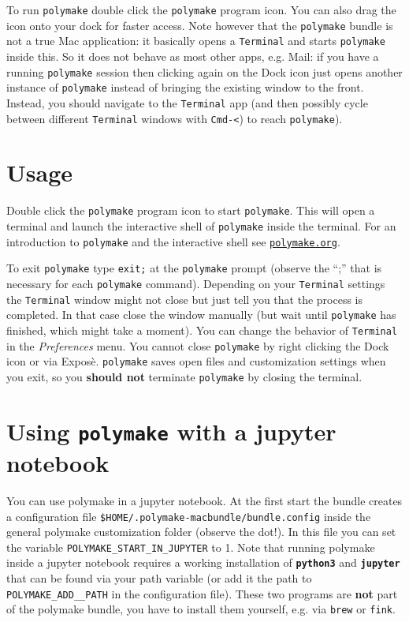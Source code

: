 \documentclass[a4paper]{amsart}
\newcommand{\polymake}{\texttt{polymake}\xspace}
\begin{document}
To run \polymake double click the \polymake program icon. You can also drag the icon onto your dock for faster access. Note however that the \polymake bundle is not a true Mac application: it basically opens a \texttt{Terminal} and starts \polymake inside this. So it does not behave as most other apps, e.g. Mail: if you have a running \polymake session then clicking again on the Dock icon just opens another instance of \polymake instead of bringing the existing window to the front. Instead, you should navigate to the \texttt{Terminal} app (and then possibly cycle between different \texttt{Terminal} windows with \texttt{Cmd-<}) to reach \polymake).

\section*{Usage}

Double click the \polymake program icon to start \polymake. This will open a terminal and launch the interactive shell of \polymake inside the terminal. For an introduction to \polymake and the interactive shell see \href{http://polymake.org}{\tt polymake.org}\;.

To exit \polymake type \texttt{exit;} at the \polymake prompt (observe the ``;'' that is necessary for each \polymake command). Depending on your \texttt{Terminal} settings the \texttt{Terminal} window might not close but just tell you that the process is completed. In that case close the window manually (but wait until \polymake has finished, which might take a moment). You can change the behavior of \texttt{Terminal} in the \textit{Preferences} menu.  You cannot close \polymake by right clicking the Dock icon or via Expos\`e. \polymake saves open files and customization settings when you exit, so you \textbf{should not} terminate \polymake by closing the terminal.

\section*{Using \polymake with a jupyter notebook}

You can use polymake in a jupyter notebook. At the first start the bundle creates a configuration file \texttt{\$HOME/.polymake-macbundle/bundle.config} inside the general polymake customization folder (observe the dot!). In this file you can set the variable \texttt{POLYMAKE\_START\_IN\_JUPYTER} to 1. Note that running polymake inside a jupyter notebook requires a working installation of \texttt{\bf python3} and \texttt{\bf jupyter} that can be found via your path variable (or add it the path to \texttt{POLYMAKE\_ADD_\_PATH} in the configuration file). These two programs are \textbf{not} part of the polymake bundle, you have to install them yourself, e.g. via \texttt{brew} or \texttt{fink}.
\end{document}
